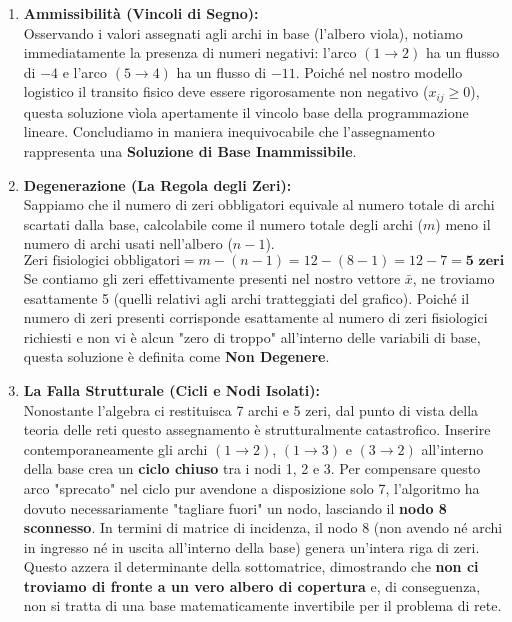 \documentclass[12pt, a4paper]{article}
\begin{document}
	\begin{enumerate}[label=\arabic*., itemsep=6pt, leftmargin=1.5cm]
		\item \textbf{Ammissibilità (Vincoli di Segno):}\\
		Osservando i valori assegnati agli archi in base (l'albero viola), notiamo immediatamente la presenza di numeri negativi: l'arco $(1\to2)$ ha un flusso di $-4$ e l'arco $(5\to4)$ ha un flusso di $-11$. Poiché nel nostro modello logistico il transito fisico deve essere rigorosamente non negativo ($x_{ij} \geq 0$), questa soluzione vìola apertamente il vincolo base della programmazione lineare. Concludiamo in maniera inequivocabile che l'assegnamento rappresenta una \textbf{Soluzione di Base Inammissibile}.
		
		\item \textbf{Degenerazione (La Regola degli Zeri):}\\
		Sappiamo che il numero di zeri obbligatori equivale al numero totale di archi scartati dalla base, calcolabile come il numero totale degli archi ($m$) meno il numero di archi usati nell'albero ($n-1$).
		\[
		\text{Zeri fisiologici obbligatori} = m - (n - 1) = 12 - (8 - 1) = 12 - 7 = \mathbf{5 \text{ zeri}}
		\]
		Se contiamo gli zeri effettivamente presenti nel nostro vettore $\bar{x}$, ne troviamo esattamente 5 (quelli relativi agli archi tratteggiati del grafico). Poiché il numero di zeri presenti corrisponde esattamente al numero di zeri fisiologici richiesti e non vi è alcun "zero di troppo" all'interno delle variabili di base, questa soluzione è definita come \textbf{Non Degenere}.
		
		\item \textbf{La Falla Strutturale (Cicli e Nodi Isolati):}\\
		Nonostante l'algebra ci restituisca 7 archi e 5 zeri, dal punto di vista della teoria delle reti questo assegnamento è strutturalmente catastrofico. Inserire contemporaneamente gli archi $(1\to2)$, $(1\to3)$ e $(3\to2)$ all'interno della base crea un \textbf{ciclo chiuso} tra i nodi 1, 2 e 3. Per compensare questo arco "sprecato" nel ciclo pur avendone a disposizione solo 7, l'algoritmo ha dovuto necessariamente "tagliare fuori" un nodo, lasciando il \textbf{nodo 8 sconnesso}. 
		In termini di matrice di incidenza, il nodo 8 (non avendo né archi in ingresso né in uscita all'interno della base) genera un'intera riga di zeri. Questo azzera il determinante della sottomatrice, dimostrando che \textbf{non ci troviamo di fronte a un vero albero di copertura} e, di conseguenza, non si tratta di una base matematicamente invertibile per il problema di rete.
	\end{enumerate}
	
\end{document}
